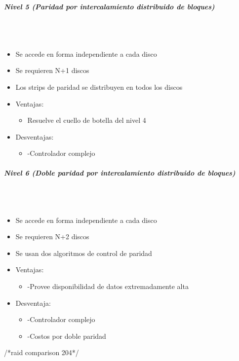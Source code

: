 \subparagraph{Nivel 5 (Paridad por intercalamiento distribuido de bloques)}\mbox{}\\\\%
\begin{itemize}
\item Se accede en forma independiente a cada disco
\item Se requieren N+1 discos
\item Los strips de paridad se distribuyen en todos los discos
\item Ventajas:
	\begin{itemize}
	\item Resuelve el cuello de botella del nivel 4
	\end{itemize}
\item Desventajas:
	\begin{itemize}
	\item -Controlador complejo
	\end{itemize}
\end{itemize}

\subparagraph{Nivel 6 (Doble paridad por intercalamiento distribuido de bloques)}\mbox{}\\\\%
\begin{itemize}
\item Se accede en forma independiente a cada disco
\item Se requieren N+2 discos
\item Se usan dos algoritmos de control de paridad
\item Ventajas:
	\begin{itemize}
	\item -Provee disponibilidad de datos extremadamente alta
	\end{itemize}
\item Desventaja:
	\begin{itemize}
	\item -Controlador complejo
	\item -Costos por doble paridad
	\end{itemize}
\end{itemize}


/*raid comparison 204*/
